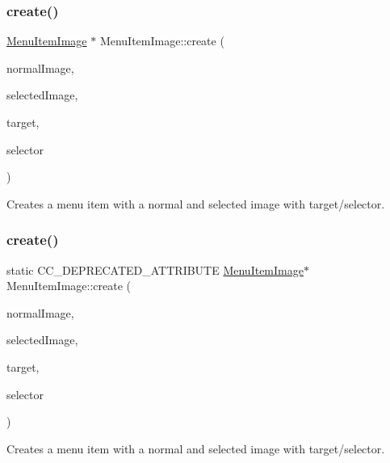 \subsubsection{\texorpdfstring{create()}{create()}\hspace{0.1cm}{\footnotesize\ttfamily [7/14]}}
{\footnotesize\ttfamily \hyperlink{classMenuItemImage}{Menu\+Item\+Image} $\ast$ Menu\+Item\+Image\+::create (\begin{DoxyParamCaption}\item[{const std\+::string \&}]{normal\+Image,  }\item[{const std\+::string \&}]{selected\+Image,  }\item[{\hyperlink{classRef}{Ref} $\ast$}]{target,  }\item[{S\+E\+L\+\_\+\+Menu\+Handler}]{selector }\end{DoxyParamCaption})\hspace{0.3cm}{\ttfamily [static]}}

Creates a menu item with a normal and selected image with target/selector. \mbox{\label{classMenuItemImage_ae16b8121290111a15221ddd9070ebd9a}} 
\subsubsection{\texorpdfstring{create()}{create()}\hspace{0.1cm}{\footnotesize\ttfamily [8/14]}}
{\footnotesize\ttfamily static C\+C\+\_\+\+D\+E\+P\+R\+E\+C\+A\+T\+E\+D\+\_\+\+A\+T\+T\+R\+I\+B\+U\+TE \hyperlink{classMenuItemImage}{Menu\+Item\+Image}$\ast$ Menu\+Item\+Image\+::create (\begin{DoxyParamCaption}\item[{const std\+::string \&}]{normal\+Image,  }\item[{const std\+::string \&}]{selected\+Image,  }\item[{\hyperlink{classRef}{Ref} $\ast$}]{target,  }\item[{S\+E\+L\+\_\+\+Menu\+Handler}]{selector }\end{DoxyParamCaption})\hspace{0.3cm}{\ttfamily [static]}}

Creates a menu item with a normal and selected image with target/selector. \mbox{\label{classMenuItemImage_a802e4337cf147e4086a8c45c0a7b8091}} 
